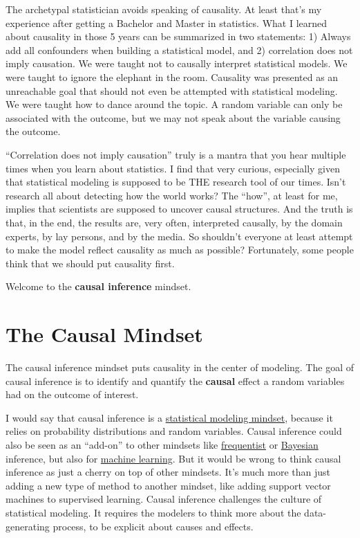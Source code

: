 \documentclass[
  10pt,
]{scrbook}
\begin{document}
The archetypal statistician avoids speaking of causality.
At least that's my experience after getting a Bachelor and Master in statistics.
What I learned about causality in those 5 years can be summarized in two statements: 1) Always add all confounders when building a statistical model, and 2) correlation does not imply causation.
We were taught not to causally interpret statistical models.
We were taught to ignore the elephant in the room.
Causality was presented as an unreachable goal that should not even be attempted with statistical modeling.
We were taught how to dance around the topic.
A random variable can only be associated with the outcome, but we may not speak about the variable causing the outcome.

``Correlation does not imply causation'' truly is a mantra that you hear multiple times when you learn about statistics.
I find that very curious, especially given that statistical modeling is supposed to be THE research tool of our times.
Isn't research all about detecting how the world works?
The ``how'', at least for me, implies that scientists are supposed to uncover causal structures.
And the truth is that, in the end, the results are, very often, interpreted causally, by the domain experts, by lay persons, and by the media.
So shouldn't everyone at least attempt to make the model reflect causality as much as possible?
Fortunately, some people think that we should put causality first.

Welcome to the \textbf{causal inference} mindset.

\hypertarget{the-causal-mindset}{%
\section{The Causal Mindset}\label{the-causal-mindset}}

The causal inference mindset puts causality in the center of modeling.
The goal of causal inference is to identify and quantify the \textbf{causal} effect a random variables had on the outcome of interest.

I would say that causal inference is a \protect\hyperlink{statistical-modeling}{statistical modeling mindset}, because it relies on probability distributions and random variables.
Causal inference could also be seen as an ``add-on'' to other mindsets like \protect\hyperlink{frequentism}{frequentist} or \protect\hyperlink{bayesian}{Bayesian} inference, but also for \protect\hyperlink{machine-learning}{machine learning}.
But it would be wrong to think causal inference as just a cherry on top of other mindsets.
It's much more than just adding a new type of method to another mindset, like adding support vector machines to supervised learning.
Causal inference challenges the culture of statistical modeling.
It requires the modelers to think more about the data-generating process, to be explicit about causes and effects.
\end{document}
